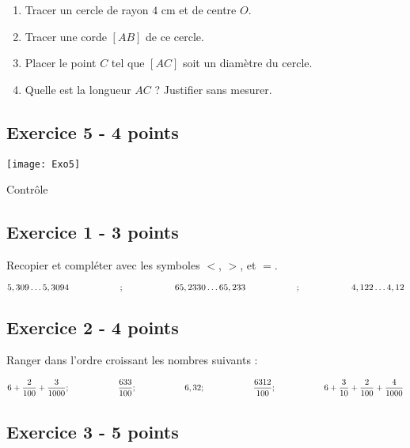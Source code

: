 \documentclass[12 pt]{extarticle}
\theoremstyle{plain}
\begin{document}
\begin{enumerate}

\item  Tracer un cercle de rayon $4$ cm et de centre $O$.
 \item Tracer une corde $[AB]$ de ce cercle. 
 \item Placer le point $C$ tel que $[AC]$ soit un diamètre du cercle.
 \item Quelle est la longueur $AC$ ? Justifier sans mesurer. 
\end{enumerate}
 \subsection*{Exercice 5 - 4 points}
 \texttt{[image: Exo5]}
 
 \newpage
 

\begin{center}{\Large Contrôle}\\ 
 \end{center}
 
  \subsection*{Exercice 1 - 3 points} 
 
 Recopier et compléter avec les symboles $<$, $>$, et $=$. 
 
 \[ 5,309 \ldots 5, 3094 \hspace{2 cm}; \hspace{2 cm}
 65, 2330 \ldots 65, 233 \hspace{2 cm}; \hspace{2 cm}
 4,122 \ldots 4, 12\]
 
 \subsection*{Exercice 2 - 4 points}
 
 Ranger dans l'ordre croissant les nombres suivants : 
 
 \[ 
 6 + \frac{2}{100} + \frac{3}{1000}; \hspace{2 cm}
 \frac{633}{100}; \hspace{2 cm}
 6,32    ; \hspace{2 cm}
 \frac{6312}{100} ; \hspace{2 cm}
 6 + \frac3{10} + \frac2{100} + \frac4{1000}
 \]
 
 \subsection*{Exercice 3 - 5 points}
 
\end{document}
